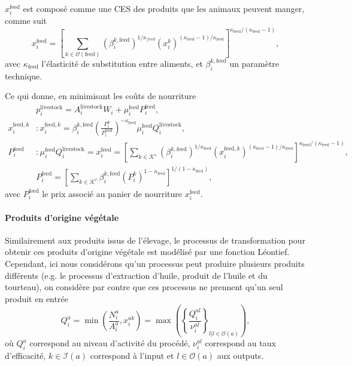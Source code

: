 $x_i^\text{feed}$ est composé comme une CES des produits que les animaux peuvent manger, comme suit
\begin{equation}
	x_i^\text{feed} = \left[ \sum_{k \in \mathcal{O}(\text{feed})} (\beta_i^{k, \text{feed}})^{1/\kappa_{feed}} (x_i^k)^{(\kappa_{\text{feed}} - 1) / \kappa_{\text{feed}}}  \right]^{\kappa_{\text{feed}}/(\kappa_{\text{feed}} - 1)},
\end{equation}
avec $\kappa_{\text{feed}}$ l’élasticité de substitution entre aliments, et $\beta_i^{k, \text{feed}}$ un paramètre technique.

Ce qui donne, en minimisant les coûts de nourriture
\begin{align}
	                                       & p_i^{\text{livestock}}                                       = A_i^\text{livestock} W_i + \mu^\text{feed}_i P^{\text{feed}}_i,
	\\
	\label{eq_xfeedik} x^{\text{feed},k}_i & :  x^{\text{feed},k}_i                    = \beta_i^{k, \text{feed}} \left( \frac{P_i^k}{P^{\text{feed}}_i} \right)^{-\kappa_{\text{feed}}} \mu^\text{feed}_i Q_i^{\text{livestock}},                                                                                                           \\
	\label{eq_pfeedi} P_i^\text{feed}      & :      \mu^{\text{feed}}_i Q_i^{\text{livestock}} = x^{\text{feed}}_i = \left[\sum_{k \in \mathcal{K}^c} (\beta_i^{k, \text{feed}})^{1/\kappa_{\text{feed}}} (x^{\text{feed},k}_i)^{(\kappa_{\text{feed}} - 1)/\kappa_{\text{feed}}} \right]^{\kappa_{\text{feed}}/(\kappa_{\text{feed}} - 1)},
	\\
	                                       & P^{\text{feed}}_i                                           = \left[ \sum_{k \in \mathcal{K}^c} \beta_i^{k, \text{feed}} (P_i^k)^{1 - \kappa_{\text{feed}}}\right]^{1/(1 - \kappa_{\text{feed}})},
\end{align}
avec $P_i^\text{feed}$ le prix associé au panier de nourriture $x_i^\text{feed}$.

\paragraph{Produits d’origine végétale} Similairement aux produits issus de l’élevage, le processus de transformation pour obtenir ces produits d’origine végétale est modélisé par une fonction Léontief. Cependant, ici nous considérons qu’un processus peut produire plusieurs produits différents (e.g. le processus d’extraction d’huile, produit de l’huile et du tourteau), on considère par contre que ces processus ne prennent qu’un seul produit en entrée
\begin{equation}
	Q_i^a = \min \left( \frac{N^a_i}{A_i^a}, x^{ak}_i\right)= \max \left( \left\{ \frac{Q_i^{al}}{\nu^{al}_i} \right\}_{l|l\in\mathcal{O}(a)} \right),
\end{equation}
où $Q_i^a$ correspond au niveau d’activité du procédé, $\nu_i^{al}$ correspond au taux d’efficacité, $k \in \mathcal{I}(a)$ correspond à l’input et $l \in \mathcal{O}(a)$ aux outputs.


